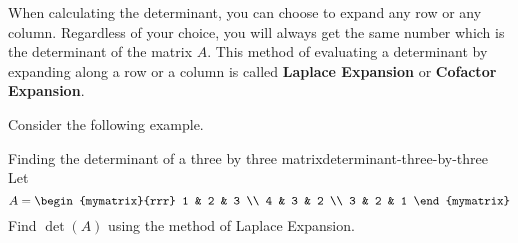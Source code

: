 When calculating the determinant, you can choose to expand any row or any column. Regardless 
of your choice, you will always get the same number which is the determinant of the matrix $A$. 
This method of evaluating a determinant by expanding along a row or a column is called \textbf{Laplace
Expansion} or \textbf{Cofactor Expansion}.


Consider the following example. 

\begin{example}{Finding the determinant of a three by three matrix}{determinant-three-by-three}
Let 
\begin{equation*}
A=\begin{mymatrix}{rrr}
1 & 2 & 3 \\
4 & 3 & 2 \\
3 & 2 & 1
\end{mymatrix} 
\end{equation*}
Find $\det(A)$ using the method of Laplace Expansion.
\end{example}

